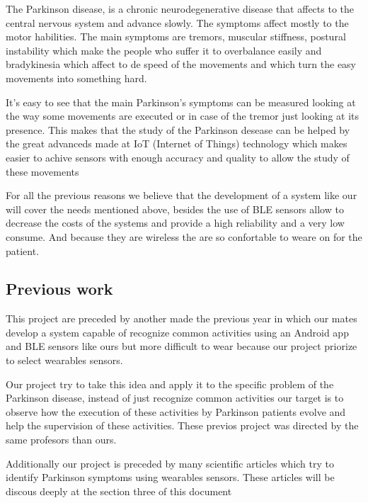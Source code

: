 The Parkinson disease, is a chronic neurodegenerative disease that affects to the central nervous system and advance slowly. The symptoms affect mostly to the motor habilities. The main symptoms are tremors, muscular stiffness, postural instability which make the people who suffer it to overbalance easily and bradykinesia which affect to de speed of the movements and which turn the easy movements into something hard.
\newline

It's easy to see that the main Parkinson's symptoms can be measured looking at the way some movements are executed or in case of the tremor just looking at its presence. This makes that the study of the Parkinson desease can be helped by the great advanceds made at IoT (Internet of Things) technology which makes easier to achive sensors with enough accuracy and quality to allow the study of these movements
\newline

For all the previous reasons we believe that the development of a system like our will cover the needs mentioned above, besides the use of BLE sensors allow to decrease the costs of the systems and provide a high reliability and a very low consume. And because they are wireless the are so confortable to weare on for the patient.
\newline

\subsection{Previous work}

This project are preceded by another made the previous year \cite{TFG_Anterior} in which our mates develop a system capable of recognize common activities using an Android app and BLE sensors like ours but more difficult to wear because our project priorize to select wearables sensors.
\newline

Our project try to take this idea and apply it to the specific problem of the Parkinson disease, instead of just recognize common activities our target is to observe how the execution of these activities by Parkinson patients evolve and help the supervision of these activities. These previos project was directed by the same profesors than ours.
\newline

Additionally our project is preceded by many scientific articles which try to identify Parkinson symptoms using wearables sensors. These articles will be discous deeply at the section three of this document
\newline

